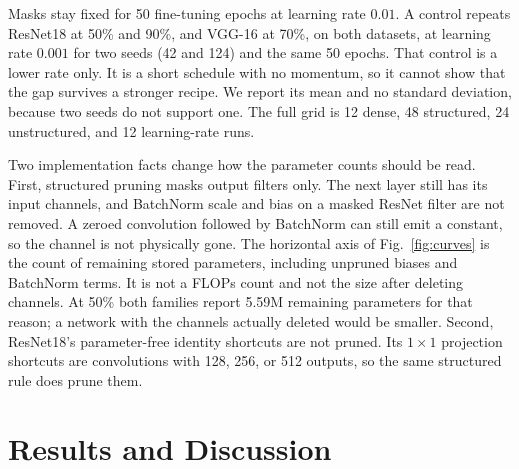 \documentclass[conference]{IEEEtran}
\begin{document}
Masks stay fixed for 50 fine-tuning epochs at learning rate $0.01$.
A control repeats ResNet18 at 50\% and 90\%, and VGG-16 at 70\%, on both
datasets, at learning rate $0.001$ for two seeds (42 and 124) and the
same 50 epochs. That control is a lower rate only. It is a short
schedule with no momentum, so it cannot show that the gap survives a
stronger recipe. We report its mean and no standard deviation, because
two seeds do not support one. The full grid is 12 dense, 48 structured,
24 unstructured, and 12 learning-rate runs.

Two implementation facts change how the parameter counts should be
read. First, structured pruning masks output filters only. The next
layer still has its input channels, and BatchNorm scale and bias on a
masked ResNet filter are not removed. A zeroed convolution followed by
BatchNorm can still emit a constant, so the channel is not physically
gone. The horizontal axis of Fig.~\ref{fig:curves} is the count of
remaining stored parameters, including unpruned biases and BatchNorm
terms. It is not a FLOPs count and not the size after deleting channels.
At 50\% both families report 5.59M remaining parameters for that
reason; a network with the channels actually deleted would be smaller.
Second, ResNet18's parameter-free identity shortcuts are not pruned.
Its $1\times1$ projection shortcuts are convolutions with 128, 256, or
512 outputs, so the same structured rule does prune them.

\section{Results and Discussion}
\label{sec:results}
\end{document}
